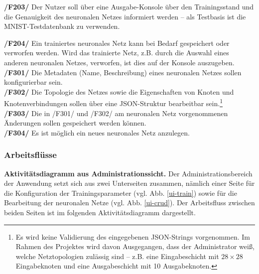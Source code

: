 \textbf{/F203/} Der Nutzer soll über eine Ausgabe-Konsole über den Trainingsstand und die Genauigkeit des neuronalen Netzes informiert werden -- als Testbasis ist die MNIST-Testdatenbank zu verwenden.

\textbf{/F204/} Ein trainiertes neuronales Netz kann bei Bedarf gespeichert oder verworfen werden. Wird das trainierte Netz, z.B. durch die Auswahl eines anderen neuronalen Netzes, verworfen, ist dies auf der Konsole auszugeben. \\[-0.2cm]

\textbf{/F301/} Die Metadaten (Name, Beschreibung) eines neuronalen Netzes sollen konfigurierbar sein.\\[-0.2cm]

\textbf{/F302/} Die Topologie des Netzes sowie die Eigenschaften von Knoten und Knotenverbindungen sollen über eine JSON-Struktur bearbeitbar sein.\footnote{Es wird keine Validierung des eingegebenen JSON-Strings vorgenommen. Im Rahmen des Projektes wird davon Ausgegangen, dass der Administrator weiß, welche Netztopologien zulässig sind -- z.B. eine Eingabeschicht mit $28 \times 28$ Eingabeknoten und eine Ausgabeschicht mit 10 Ausgabeknoten.}\\[-0.2cm]

\textbf{/F303/} Die in /F301/ und /F302/ am neuronalen Netz vorgenommenen Änderungen sollen gespeichert werden können.\\[-0.2cm]

\textbf{/F304/} Es ist möglich ein neues neuronales Netz anzulegen.

\newpage
\subsubsection{Arbeitsflüsse}

\textbf{Aktivitätsdiagramm aus Administrationssicht.} Der Administrationsbereich der Anwendung setzt sich aus zwei Unterseiten zusammen, nämlich einer Seite für die Konfiguration der Trainingsparameter (vgl. Abb. \ref{ui-train}) sowie für die Bearbeitung der neuronalen Netze (vgl. Abb. \ref{ui-crud}). Der Arbeitsfluss zwischen beiden Seiten ist im folgenden Aktivitätsdiagramm dargestellt.

